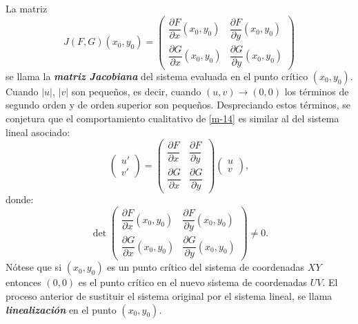 \documentclass[a5paper,doc,10pt,noapacite]{apa6}
\begin{document}
{{La matriz
\[
	J(F,G)(x_0,y_0)=\begin{pmatrix} \dfrac{\partial F}{\partial x}(x_0,y_0) & \dfrac{\partial F}{\partial y}(x_0,y_0) \\[1em]
\dfrac{\partial G}{\partial x}(x_0,y_0) & \dfrac{\partial G}{\partial y}(x_0,y_0)\end{pmatrix}
\]
se llama la \emph{\textbf{matriz Jacobiana}} del sistema evaluada en el punto crítico \((x_0,y_0)\). Cuando \(|u|\), \(|v|\) son pequeños, es decir, cuando \((u,v)\to(0,0)\) los términos de segundo orden y de orden superior son pequeños. Despreciando estos términos, se conjetura que el comportamiento cualitativo de \eqref{m-14} es similar al del sistema lineal asociado:
\begin{equation}\label{m-15}
	\begin{pmatrix} u' \\ v' \end{pmatrix}=\begin{pmatrix} \dfrac{\partial F}{\partial x} & \dfrac{\partial F}{\partial y} \\ \dfrac{\partial G}{\partial x} & \dfrac{\partial G}{\partial y} \end{pmatrix}	\begin{pmatrix} u \\ v \end{pmatrix},
\end{equation}
donde:
\[
\det\begin{pmatrix} \dfrac{\partial F}{\partial x}(x_0,y_0) & \dfrac{\partial F}{\partial y}(x_0,y_0) \\[1em]
\dfrac{\partial G}{\partial x}(x_0,y_0) & \dfrac{\partial G}{\partial y}(x_0,y_0)\end{pmatrix}\neq 0.
\]
Nótese que si \((x_0,y_0)\) es un punto crítico del sistema  de coordenadas \(XY\) entonces \((0,0)\) es el punto crítico en el nuevo sistema de coordenadas \(UV\). El proceso anterior de sustituir el sistema original por el  sistema lineal, se llama \emph{\textbf{linealización}} en el punto \((x_0,y_0)\).

}}
\end{document}
